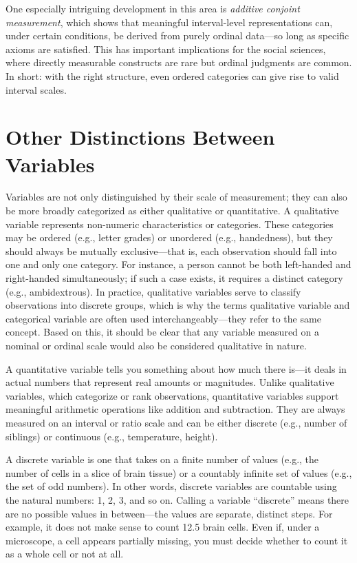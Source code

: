 One especially intriguing development in this area is \textit{additive conjoint measurement}, which shows that meaningful interval-level representations can, under certain conditions, be derived from purely ordinal data—so long as specific axioms are satisfied. This has important implications for the social sciences, where directly measurable constructs are rare but ordinal judgments are common. In short: with the right structure, even ordered categories can give rise to valid interval scales.

\section{Other Distinctions Between Variables}

Variables are not only distinguished by their scale of measurement; they can also be more broadly categorized as either qualitative or quantitative. A \gls{qualitative variable} represents non-numeric characteristics or categories. These categories may be ordered (e.g., letter grades) or unordered (e.g., handedness), but they should always be mutually exclusive—that is, each observation should fall into one and only one category. For instance, a person cannot be both left-handed and right-handed simultaneously; if such a case exists, it requires a distinct category (e.g., ambidextrous). In practice, qualitative variables serve to classify observations into discrete groups, which is why the terms qualitative variable and categorical variable are often used interchangeably—they refer to the same concept. Based on this, it should be clear that any variable measured on a nominal or ordinal scale would also be considered qualitative in nature.\label{sec:qual_var}

A \gls{quantitative variable} tells you something about how much there is—it deals in actual numbers that represent real amounts or magnitudes. Unlike qualitative variables, which categorize or rank observations, quantitative variables support meaningful arithmetic operations like addition and subtraction. They are always measured on an interval or ratio scale and can be either discrete (e.g., number of siblings) or continuous (e.g., temperature, height).\label{sec:quant_var}

A \gls{discrete variable} is one that takes on a finite number of values (e.g., the number of cells in a slice of brain tissue) or a countably infinite set of values (e.g., the set of odd numbers). In other words, discrete variables are countable using the natural numbers: 1, 2, 3, and so on. Calling a variable ``discrete'' means there are no possible values in between—the values are separate, distinct steps. For example, it does not make sense to count 12.5 brain cells. Even if, under a microscope, a cell appears partially missing, you must decide whether to count it as a whole cell or not at all.

